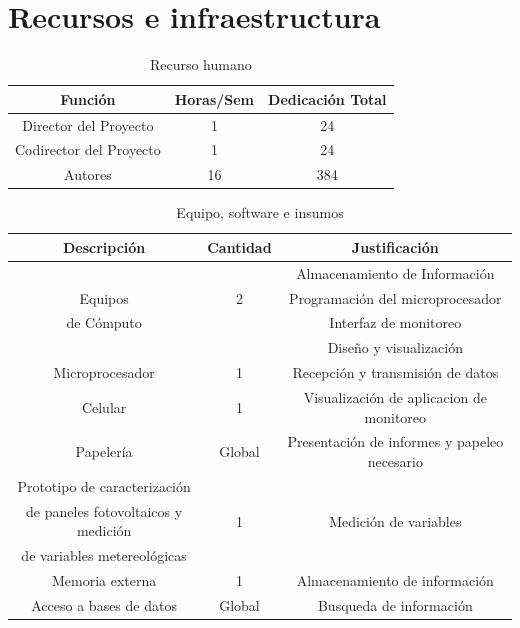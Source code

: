 \section{Recursos e infraestructura}




\begin{table}[ht]
\caption{\label{tab:Recurso-humano} Recurso humano}
\begin{centering}
\begin{tabular}{|c||c||c|}
\hline 
Función  & Horas/Sem & Dedicación Total
\tabularnewline
\hline
\hline 
Director del Proyecto & 1 & 24 \tabularnewline %
\hline 
\hline
Codirector del Proyecto & 1 & 24 \tabularnewline %
\hline 
\hline
Autores & 16  & 384 \tabularnewline %
\hline
\hline
\end{tabular}
\par \end{centering}
\end{table}

\begin{table}[ht]
\caption{\label{tab:Resumen-costos-equipo} Equipo, software e insumos}
\begin{centering}
\begin{tabular}{|c||c||c|}
\hline 
\textbf{Descripción} & \textbf{Cantidad} & \textbf{Justificación} \tabularnewline
\hline
\hline 
 &  &  Almacenamiento de Información\tabularnewline
Equipos  & 2 & Programación del microprocesador \tabularnewline
 de Cómputo &  & Interfaz de monitoreo \tabularnewline & & Diseño y visualización   \tabularnewline
 \hline
 \hline
Microprocesador  & 1 & Recepción y transmisión de datos   \tabularnewline
\hline  
\hline
Celular  & 1 &  Visualización de aplicacion de monitoreo\tabularnewline
\hline 
\hline
Papelería & Global & Presentación de informes y papeleo necesario  \tabularnewline 
\hline 
\hline
Prototipo de caracterización &  &  \tabularnewline 
de paneles fotovoltaicos y medición & 1 & Medición de variables \tabularnewline 
de variables metereológicas & & \tabularnewline 
\hline
\hline
Memoria externa  & 1 & Almacenamiento de información\tabularnewline
\hline
\hline
Acceso a bases de datos & Global & Busqueda de información \tabularnewline
\hline
\hline
\end{tabular}
\par\end{centering}
\end{table}


